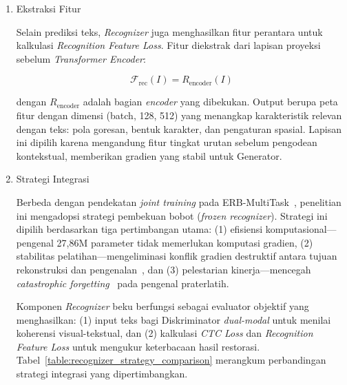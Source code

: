 \begin{enumerate}[label=\arabic*., leftmargin=*, wide=0pt, itemsep=1ex]
    \item Ekstraksi Fitur

Selain prediksi teks, \textit{Recognizer} juga menghasilkan fitur perantara untuk kalkulasi \textit{Recognition Feature Loss}. Fitur diekstrak dari lapisan proyeksi sebelum \textit{Transformer Encoder}:

\begin{equation}
  \mathcal{F}_{\text{rec}}(I) = R_{\text{encoder}}(I)
  \label{eq:IV.2}
\end{equation}

\noindent dengan $R_{\text{encoder}}$ adalah bagian \textit{encoder} yang dibekukan. Output berupa peta fitur dengan dimensi (batch, 128, 512) yang menangkap karakteristik relevan dengan teks: pola goresan, bentuk karakter, dan pengaturan spasial. Lapisan ini dipilih karena mengandung fitur tingkat urutan sebelum pengodean kontekstual, memberikan gradien yang stabil untuk Generator.

    \item Strategi Integrasi


Berbeda dengan pendekatan \textit{joint training} pada ERB-MultiTask~\parencite{erb2021}, penelitian ini mengadopsi strategi pembekuan bobot (\textit{frozen recognizer}). Strategi ini dipilih berdasarkan tiga pertimbangan utama: (1) efisiensi komputasional---pengenal 27,86M parameter tidak memerlukan komputasi gradien, (2) stabilitas pelatihan---mengeliminasi konflik gradien destruktif antara tujuan rekonstruksi dan pengenalan~\parencite{souibgui2022,kang2021pay}, dan (3) pelestarian kinerja---mencegah \textit{catastrophic forgetting}~\parencite{kirkpatrick2017overcoming} pada pengenal praterlatih.

Komponen \textit{Recognizer} beku berfungsi sebagai evaluator objektif yang menghasilkan: (1) input teks bagi Diskriminator \textit{dual-modal} untuk menilai koherensi visual-tekstual, dan (2) kalkulasi \textit{CTC Loss} dan \textit{Recognition Feature Loss} untuk mengukur keterbacaan hasil restorasi. Tabel~\ref{table:recognizer_strategy_comparison} merangkum perbandingan strategi integrasi yang dipertimbangkan.
\end{enumerate}

